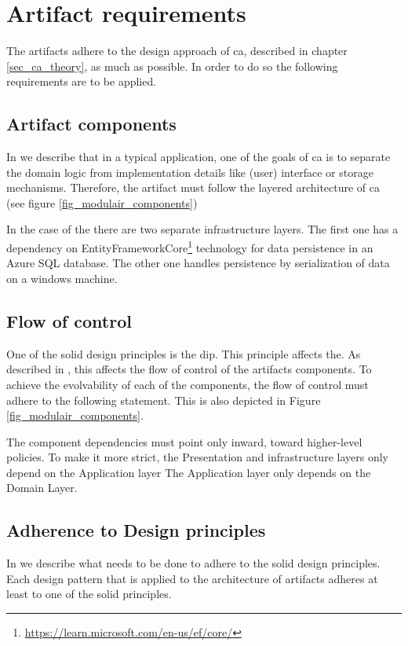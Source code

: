 \section{Artifact requirements} \label{sec_artifact_requirements}

The artifacts adhere to the design approach of \gls{ca}, described in chapter
\ref{sec_ca_theory}, as much as possible. In order to do so the following
requirements are to be applied.

\subsection{Artifact components}
In  we describe that in a typical application, one of the goals of
\gls{ca} is to separate the domain logic from implementation details like (user) interface
or storage mechanisms. Therefore, the artifact must follow the layered architecture of
\gls{ca} (see figure \ref{fig_modulair_components})

In the case of the  there are two separate infrastructure
layers. The first one has a dependency on
EntityFrameworkCore\footnote{\url{https://learn.microsoft.com/en-us/ef/core/}} technology
for data persistence in an Azure SQL database. The other one handles persistence by
serialization of data on a windows machine.

\subsection{Flow of control}
One of the \gls{solid} design principles is the \acrfull{dip}. This principle affects the.
As described in , this affects the flow of control of the
artifacts components. To achieve the evolvability of each of the components, the flow of
control must adhere to the following statement. This is also depicted in Figure
\ref{fig_modulair_components}.

The component dependencies must point only inward, toward higher-level policies. To make
it more strict, the Presentation and infrastructure layers only depend on the Application
layer The Application layer only depends on the  Domain Layer.

\subsection{Adherence to Design principles}
In  we describe what needs to be done to adhere to the
\gls{solid} design principles. Each design pattern that is applied to the architecture of
artifacts adheres at least to one of the \gls{solid} principles.


